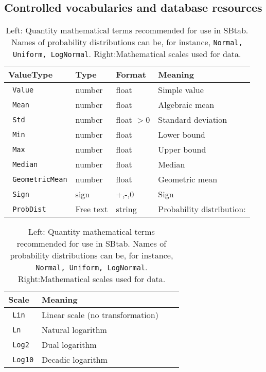 \documentclass[a4paper]{article}
\newcommand{\defint}[1] {\texttt{\color{darkgreen} #1}}
\begin{document}
\begin{appendix}
\clearpage

\section{Controlled vocabularies and database resources}
\label{appendixB}


\begin{table}[h!]
  \begin{center}
    \begin{tabular}{|l|l|l|l|}
      \hline
      ValueType       & Type  & Format &  Meaning\\
      \hline                            
      \defint{Value} & number & float & Simple value  \\
      \defint{Mean}  & number & float & Algebraic mean  \\
      \defint{Std}   & number & float $>0$ & Standard deviation  \\
      \defint{Min}   & number & float & Lower bound \\
      \defint{Max}   & number & float & Upper bound  \\
      \defint{Median}& number & float & Median  \\
      \defint{GeometricMean}& number & float & Geometric mean  \\
      \defint{Sign}  & sign & +,-,0 & Sign  \\
      \defint{ProbDist} & Free text & string & Probability distribution: \\
      \hline
    \end{tabular}\hspace{5mm}
    \begin{tabular}{|l|l|l|l|}
      \hline
      Scale  &  Meaning\\
      \hline              
      \defint{Lin}   & Linear scale (no transformation)  \\
      \defint{Ln}    & Natural logarithm  \\
      \defint{Log2}  & Dual logarithm  \\
      \defint{Log10} & Decadic logarithm \\
      \hline
    \end{tabular}
  \end{center}
  \caption{Left: Quantity mathematical terms recommended for use in SBtab. 
    Names of probability distributions can be, for instance, 
    \texttt{Normal, Uniform, LogNormal}. Right:Mathematical scales used for data.}
\label{tab:quantityvaluetype}
\end{table}



\end{appendix}
\end{document}
